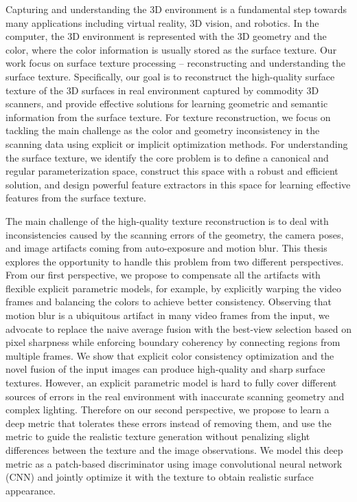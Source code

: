 Capturing and understanding the 3D environment is a fundamental step towards many applications including virtual reality, 3D vision, and robotics.
%
In the computer, the 3D environment is represented with the 3D geometry and the color, where the color information is usually stored as the surface texture. Our work focus on surface texture processing -- reconstructing and understanding the surface texture.
%
Specifically, our goal is to reconstruct the high-quality surface texture of the 3D surfaces in real environment captured by commodity 3D scanners, and provide effective solutions for learning geometric and semantic information from the surface texture.
%
For texture reconstruction, we focus on tackling the main challenge as the color and geometry inconsistency in the scanning data using explicit or implicit optimization methods.
%
For understanding the surface texture, we identify the core problem is to define a canonical and regular parameterization space, construct this space with a robust and efficient solution, and design powerful feature extractors in this space for learning effective features from the surface texture.


The main challenge of the high-quality texture reconstruction is to deal with inconsistencies caused by the scanning errors of the geometry, the camera poses, and image artifacts coming from auto-exposure and motion blur.
%
This thesis explores the opportunity to handle this problem from two different perspectives.
%
From our first perspective, we propose to compensate all the artifacts with flexible explicit parametric models, for example, by explicitly warping the video frames and balancing the colors to achieve better consistency.
%
Observing that motion blur is a ubiquitous artifact in many video frames from the input, we advocate to replace the naive average fusion with the best-view selection based on pixel sharpness while enforcing boundary coherency by connecting regions from multiple frames. We show that explicit color consistency optimization and the novel fusion of the input images can produce high-quality and sharp surface textures.
%
However, an explicit parametric model is hard to fully cover different sources of errors in the real environment with inaccurate scanning geometry and complex lighting.
%
Therefore on our second perspective, we propose to learn a deep metric that tolerates these errors instead of removing them, and use the metric to guide the realistic texture generation without penalizing slight differences between the texture and the image observations. We model this deep metric as a patch-based discriminator using image convolutional neural network (CNN) and jointly optimize it with the texture to obtain realistic surface appearance.


